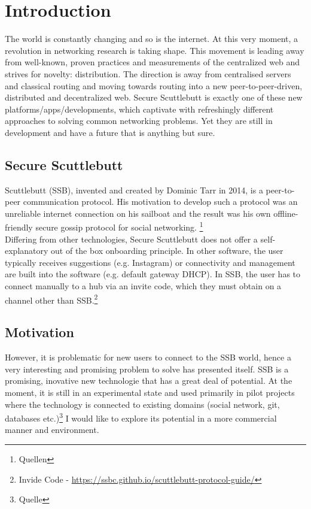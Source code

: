 \chapter{Introduction}
The world is constantly changing and so is the internet. At this very moment, a revolution in networking research is taking shape. This movement is leading away from well-known, proven practices and measurements of the centralized web and strives for novelty: distribution. The direction is away from centralised servers and classical routing and moving towards routing into a new peer-to-peer-driven, distributed and decentralized web. Secure Scuttlebutt is exactly one of these new platforms/apps/developments, which captivate with refreshingly different approaches to solving common networking problems. Yet they are still in development and have a future that is anything but sure. 
\section{Secure Scuttlebutt}
Scuttlebutt (SSB), invented and created by Dominic Tarr in 2014, is a peer-to-peer communication protocol. His motivation to develop such a protocol was an unreliable internet connection on his sailboat and the result was his own offline-friendly secure gossip protocol for social networking. \footnote{Quellen}\\

Differing from other technologies, Secure Scuttlebutt does not offer a self-explanatory out of the box onboarding principle. In other software, the user typically receives suggestions (e.g. Instagram) or connectivity and management are built into the software (e.g. default gateway DHCP). In SSB, the user has to connect manually to a hub via an invite code, which they must obtain on a channel other than SSB.\footnote{Invide Code - \url{https://ssbc.github.io/scuttlebutt-protocol-guide/}} 

\section{Motivation}
However, it is problematic for new users to connect to the SSB world, hence a very interesting and promising problem to solve has presented itself. SSB is a promising, inovative new technologie that has a great deal of potential. At the moment, it is still in an experimental state and used primarily in pilot projects where the technology is connected to existing domains (social network, git, databases etc.)\footnote{Quelle} I would like to explore its potential in a more commercial manner and environment. 
